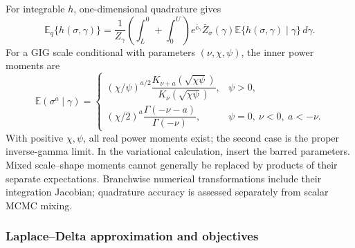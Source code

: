 \documentclass[12pt,letterpaper]{article}
\newcommand{\E}{\mathbb{E}}
\numberwithin{suppalgorithm}{section}
\numberwithin{equation}{section}
\numberwithin{table}{section}
\numberwithin{figure}{section}
\begin{document}
For integrable \(h\), one-dimensional quadrature gives
\begin{equation}
\E_q\{h(\sigma,\gamma)\}=\frac1{Z_\gamma}
 \left(\int_L^0+\int_0^U\right)
 e^{\bar c_\gamma}\bar Z_\sigma(\gamma)
 \E\{h(\sigma,\gamma)\mid\gamma\}\,d\gamma.
\label{eq:supp_structured_mixed_moments}
\end{equation}
For a GIG scale conditional with parameters \((\nu,\chi,\psi)\),
the inner power moments are
\begin{equation}
\E(\sigma^a\mid\gamma)=
\begin{cases}
(\chi/\psi)^{a/2}
 \dfrac{K_{\nu+a}(\sqrt{\chi\psi})}{K_\nu(\sqrt{\chi\psi})},
 &\psi>0,\\[4pt]
(\chi/2)^a\dfrac{\Gamma(-\nu-a)}{\Gamma(-\nu)},
 &\psi=0,\ \nu<0,\ a<-\nu.
\end{cases}
\label{eq:supp_structured_scale_moments}
\end{equation}
With positive \(\chi,\psi\), all real power moments exist; the second
case is the proper inverse-gamma limit. In the variational calculation,
insert the barred parameters. Mixed scale--shape moments cannot generally
be replaced by products of their separate expectations. Branchwise
numerical transformations include their integration Jacobian; quadrature
accuracy is assessed separately from scalar MCMC mixing.

\subsubsection{Laplace--Delta approximation and objectives}
\label{sec:elbo}
\end{document}
